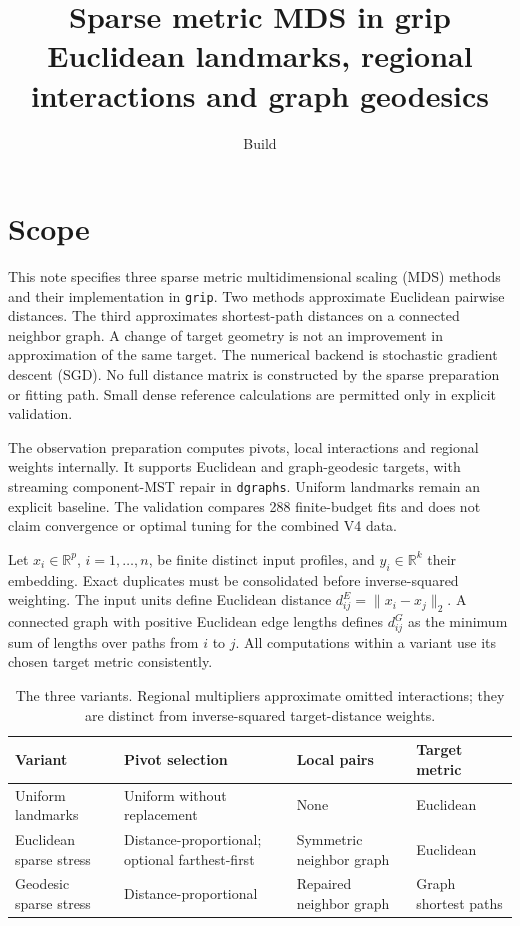 \documentclass[11pt,letterpaper]{article}
\title{Sparse metric MDS in grip\\\large Euclidean landmarks, regional interactions and graph geodesics}
\author{}
\date{Build \reportbuilddatetime}
\begin{document}
\maketitle
\section{Scope}
This note specifies three sparse metric multidimensional scaling (MDS) methods
and their implementation in \texttt{grip}. Two methods approximate Euclidean
pairwise distances. The third approximates shortest-path distances on a connected
neighbor graph. A change of target geometry is not an improvement in approximation
of the same target. The numerical backend is stochastic gradient descent (SGD).
No full distance matrix is constructed by the sparse preparation or fitting path.
Small dense reference calculations are permitted only in explicit validation.

The observation preparation computes pivots, local interactions and regional
weights internally. It supports Euclidean and graph-geodesic targets, with
streaming component-MST repair in \texttt{dgraphs}. Uniform landmarks remain an
explicit baseline. The validation compares 288 finite-budget fits and does not
claim convergence or optimal tuning for the combined V4 data.

Let $x_i\in\mathbb R^p$, $i=1,\ldots,n$, be finite distinct input profiles, and
$y_i\in\mathbb R^k$ their embedding. Exact duplicates must be consolidated before
inverse-squared weighting. The input units define Euclidean distance
$d^E_{ij}=\|x_i-x_j\|_2$. A connected graph with positive Euclidean edge lengths
defines $d^G_{ij}$ as the minimum sum of lengths over paths from $i$ to $j$.
All computations within a variant use its chosen target metric consistently.

\begin{table}[ht]\centering\small
\caption{The three variants. Regional multipliers approximate omitted interactions;
they are distinct from inverse-squared target-distance weights.}
\begin{tabularx}{\textwidth}{lXXX}\toprule
Variant & Pivot selection & Local pairs & Target metric\\\midrule
Uniform landmarks & Uniform without replacement & None & Euclidean\\
Euclidean sparse stress & Distance-proportional; optional farthest-first & Symmetric neighbor graph & Euclidean\\
Geodesic sparse stress & Distance-proportional & Repaired neighbor graph & Graph shortest paths\\\bottomrule
\end{tabularx}\end{table}
\end{document}

